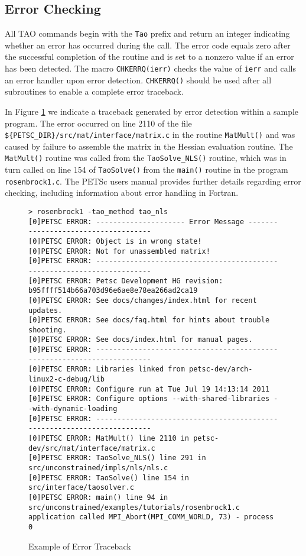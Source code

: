\subsection*{Error Checking}

All TAO commands begin with the \texttt{Tao} prefix and return an
integer indicating whether an error has occurred during the call.  The
error code equals zero after the successful completion of the routine
and is set to a nonzero value if an error has been detected.  The
macro \texttt{CHKERRQ(ierr)} checks the value of \texttt{ierr} and calls an
error handler upon error detection.  \texttt{CHKERRQ()} should be used after
all subroutines to enable a complete error traceback.

In Figure \ref{fig:traceback} we indicate a traceback generated by
error detection within a sample program. The error occurred on line
2110 of the file \texttt{\$\{PETSC\_DIR\}/src/mat/inter\-face/mat\-rix.c} in the
routine \texttt{MatMult()} and was caused by failure to assemble the 
matrix in the Hessian evaluation routine.
The \texttt{MatMult()} routine was called from
the \texttt{TaoSolve\_NLS()} routine, which was in turn called on line 
154 of \texttt{TaoSolve()} from the \texttt{main()} routine 
in the program \texttt{rosenbrock1.c}.  The PETSc users
manual \cite{petsc-user-ref} provides further details
regarding error checking, including
information about error handling in Fortran.

\begin{figure}[htb]
{\footnotesize
\begin{verbatim}
> rosenbrock1 -tao_method tao_nls
[0]PETSC ERROR: --------------------- Error Message ------------------------------------
[0]PETSC ERROR: Object is in wrong state!
[0]PETSC ERROR: Not for unassembled matrix!
[0]PETSC ERROR: ------------------------------------------------------------------------
[0]PETSC ERROR: Petsc Development HG revision: b95ffff514b66a703d96e6ae8e78ea266ad2ca19
[0]PETSC ERROR: See docs/changes/index.html for recent updates.
[0]PETSC ERROR: See docs/faq.html for hints about trouble shooting.
[0]PETSC ERROR: See docs/index.html for manual pages.
[0]PETSC ERROR: ------------------------------------------------------------------------
[0]PETSC ERROR: Libraries linked from petsc-dev/arch-linux2-c-debug/lib
[0]PETSC ERROR: Configure run at Tue Jul 19 14:13:14 2011
[0]PETSC ERROR: Configure options --with-shared-libraries --with-dynamic-loading
[0]PETSC ERROR: ------------------------------------------------------------------------
[0]PETSC ERROR: MatMult() line 2110 in petsc-dev/src/mat/interface/matrix.c
[0]PETSC ERROR: TaoSolve_NLS() line 291 in src/unconstrained/impls/nls/nls.c
[0]PETSC ERROR: TaoSolve() line 154 in src/interface/taosolver.c
[0]PETSC ERROR: main() line 94 in src/unconstrained/examples/tutorials/rosenbrock1.c
application called MPI_Abort(MPI_COMM_WORLD, 73) - process 0
\end{verbatim}
}
\caption{Example of Error Traceback}
\label{fig:traceback}
\end{figure}

